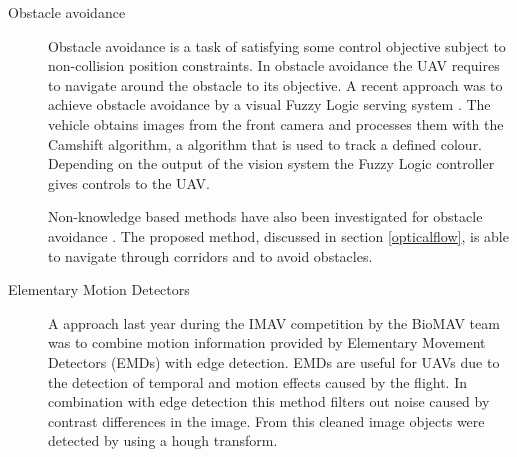 \documentclass[a4paper]{article}
\begin{document}
\begin{description}
\item[Obstacle avoidance] Obstacle avoidance is a task of satisfying some control objective subject to non-collision position constraints. In obstacle avoidance the UAV requires to navigate around the obstacle to its objective. A recent approach was to achieve obstacle avoidance by a visual Fuzzy Logic serving system \cite{Miguel2012}. The vehicle obtains images from the front camera and processes them with the Camshift algorithm, a algorithm that is used to track a defined colour. Depending on the output of the vision system the Fuzzy Logic controller gives controls to the UAV.

Non-knowledge based methods have also been investigated for obstacle avoidance \cite{Jurriaans2011}. The proposed method, discussed in section \ref{opticalflow}, is able to navigate through corridors and to avoid obstacles. 

\item[Elementary Motion Detectors] A approach last year during the IMAV competition by the BioMAV team \cite{Gerke2011} was to combine motion information provided by Elementary Movement Detectors (EMDs) with edge detection. EMDs are useful for UAVs due to the detection of temporal and motion effects caused by the flight. In combination with edge detection this method filters out noise caused by contrast differences in the image. From this cleaned image  objects were detected by using a hough transform.
\end{description}
\newpage
\end{document}
